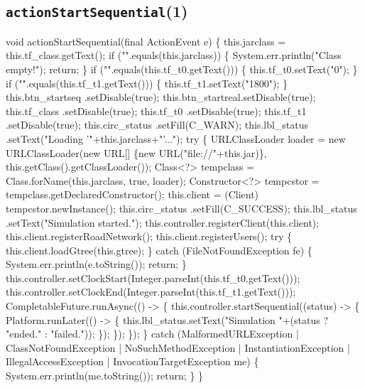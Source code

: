 \subsection{\texttt{actionStartSequential}(1)}
\nwenddocs{}\endmoddef{}
void actionStartSequential(final ActionEvent e) \{
  this.jarclass = this.tf_class.getText();
  if ("".equals(this.jarclass)) \{
    System.err.println("Class empty!");
    return;
  \}
  if ("".equals(this.tf_t0.getText())) \{
    this.tf_t0.setText("0");
  \}
  if ("".equals(this.tf_t1.getText())) \{
    this.tf_t1.setText("1800");
  \}
  this.btn_startseq .setDisable(true);
  this.btn_startreal.setDisable(true);
  this.tf_class     .setDisable(true);
  this.tf_t0        .setDisable(true);
  this.tf_t1        .setDisable(true);
  this.circ_status  .setFill(C_WARN);
  this.lbl_status   .setText("Loading '"+this.jarclass+"'...");
  try \{
    URLClassLoader loader = new URLClassLoader(new URL[] \{new URL("file://"+this.jar)\},
        this.getClass().getClassLoader());
    Class<?> tempclass = Class.forName(this.jarclass, true, loader);
    Constructor<?> tempcstor = tempclass.getDeclaredConstructor();
    this.client = (Client) tempcstor.newInstance();
    this.circ_status  .setFill(C_SUCCESS);
    this.lbl_status   .setText("Simulation started.");
    this.controller.registerClient(this.client);
    this.client.registerRoadNetwork();
    this.client.registerUsers();
    try \{
      this.client.loadGtree(this.gtree);
    \} catch (FileNotFoundException fe) \{
      System.err.println(e.toString());
      return;
    \}
    this.controller.setClockStart(Integer.parseInt(this.tf_t0.getText()));
    this.controller.setClockEnd(Integer.parseInt(this.tf_t1.getText()));
    CompletableFuture.runAsync(() -> \{
      this.controller.startSequential((status) -> \{
        Platform.runLater(() -> \{
          this.lbl_status.setText("Simulation "+(status ? "ended." : "failed."));
        \});
      \});
    \});
  \} catch (MalformedURLException
      | ClassNotFoundException
      | NoSuchMethodException
      | InstantiationException
      | IllegalAccessException
      | InvocationTargetException me) \{
    System.err.println(me.toString());
    return;
  \}
\}
\eatline
